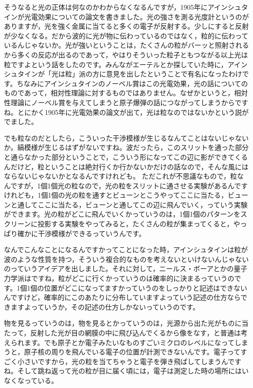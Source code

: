 \documentclass{ltjsbook}
\begin{document}
そうなると光の正体は何なのかわからなくなるんですが，1905年にアインシュタインが光電効果についての論文を書きました。光の強さを測る光度計というのがありますが，光を強く金属に当てると多くの電子が反射する。少しにすると反射が少なくなる。だから波的に光が物に伝わっているのではなく，粒的に伝わっているんじゃないか。光が強いということは，たくさんの粒がバーッと照射されるから多くの反応が出るのであって，やはりそういった粒子ともつながる以上光は粒ですよという話をしたのです。みんながエーテルとか探していた時に，アインシュタインが「光は粒」派の方に意見を出したということで有名になったわけです。ちなみにアインシュタインのノーベル賞はこの光電効果，光の話についてのものであって，相対性理論に対するものではありません。なぜかというと，相対性理論にノーベル賞を与えてしまうと原子爆弾の話につながってしまうからですね。とにかく1905年に光電効果の論文が出て，光は粒なのではないかという説がでました。

でも粒なのだとしたら，こういった干渉模様が生じるなんてことはないじゃないか。縞模様が生じるはずがないですね。波だったら，このスリットを通った部分と通らなかった部分ということで，こういう形になってこの辺に影ができてくるんだけど，粒ということは絶対行くか行かないかだけの話なので，そんな風にはならないじゃないかとなるんですけれども。
ただこれが不思議なもので，粒なんですが，1個1個光の粒なので，光の粒をスリットに通させる実験があるんですけれども，1個1個の光の粒を通すとビューンとこうやってここに当たる，ビューンと通してここに当たる，ビューンと通してこの辺に飛んでいく，っていう実験ができます。光の粒がどこに飛んでいくかっていうのは，1個1個のパターンをスクリーンに投影する実験をやってみると，たくさんの粒が集まってくると，やっぱり確かに干渉模様ができるっていうんです。

なんでこんなことになるんですかってことになった時，アインシュタインは粒が波のような性質を持つ，そういう複合的なものを考えないといけないんじゃないのっていうアイデアを出しました。それに対して，ニールス・ボーアとかの量子力学派はですね，粒がどこに行くかっていうのは確率的に決まるっていうのです。1個1個の位置がどこになってますかっていうのをしっかりと記述はできないんですけど，確率的にこのあたりに分布していますよっていう記述の仕方ならできますよっていうか，その記述の仕方しかないっていうのです。

物を見るっていうのは，物を見るとかっていうのは，光源から出た光がものに当たって，反射した光が目の網膜の中に飛び込んでくるから像をなす，と普通は考えられます。でも原子とか電子みたいなものすごいミクロのレベルになってしまうと，原子核の周りを飛んでいる電子の位置が計測できないんです。電子ってすごく小さいですから，光の粒を当てちゃうと電子を弾き飛ばしてしまうんですね。そして跳ね返って光の粒が目に届く頃には，電子は測定した時の場所にはいなくなっている。
\end{document}
